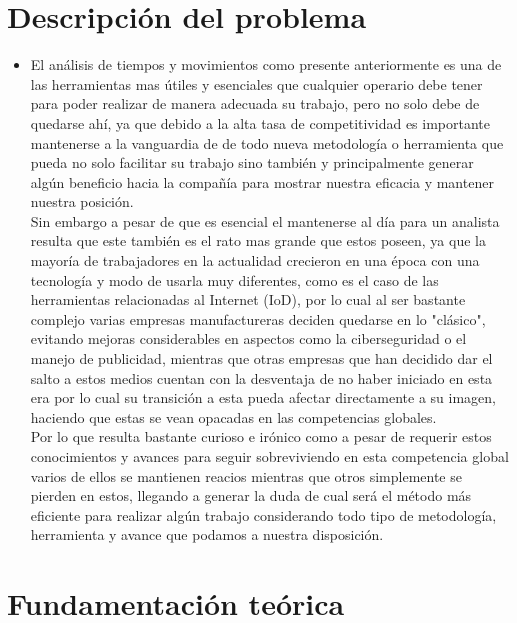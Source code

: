     \section{Descripción del problema}
    \begin{itemize}
        \item El análisis de tiempos y movimientos como presente anteriormente es una de las herramientas mas útiles y esenciales que cualquier operario debe tener para poder realizar de manera adecuada su trabajo, pero no solo debe de quedarse ahí, ya que debido a la alta tasa de competitividad es importante mantenerse a la vanguardia de de todo nueva metodología o herramienta que pueda no solo facilitar su trabajo sino también y principalmente generar algún beneficio hacia la compañía para mostrar nuestra eficacia y mantener nuestra posición.
        \\Sin embargo a pesar de que es esencial el mantenerse al día para un analista resulta que este también es el rato mas grande que estos poseen, ya que la mayoría de trabajadores en la actualidad crecieron en una época con una tecnología y modo de usarla muy diferentes, como es el caso de las herramientas relacionadas al Internet (IoD), por lo cual al ser bastante complejo varias empresas manufactureras deciden quedarse en lo "clásico", evitando mejoras considerables en aspectos como la ciberseguridad o el manejo de publicidad, mientras que otras empresas que han decidido dar el salto a estos medios cuentan con la desventaja de no haber iniciado en esta era por lo cual su transición a esta pueda afectar directamente a su imagen, haciendo que estas se vean opacadas en las competencias globales.\cite{Novatech}
        \\Por lo que resulta bastante curioso e irónico como a pesar de requerir estos conocimientos y avances para seguir sobreviviendo en esta competencia global varios de ellos se mantienen reacios mientras que otros simplemente se pierden en estos, llegando a generar la duda de cual será el método más eficiente para realizar algún trabajo considerando todo tipo de metodología, herramienta y avance que podamos a nuestra disposición.
    
    \end{itemize}
    
    \section{Fundamentación teórica}
    
